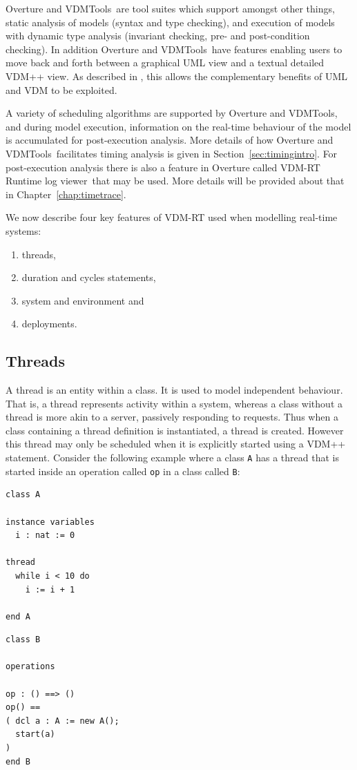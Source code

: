 \documentclass{overturerepchap}
\newcommand{\vdmtools}{VDMTools}
\newcommand{\VDMTools}{VDMTools}
\newcommand{\showtrace}{VDM-RT Runtime log viewer}
\begin{document}
Overture and \VDMTools\ are tool suites which support amongst other
things, static analysis of models (syntax and type checking), and
execution of models with dynamic type analysis (invariant checking,
pre- and post-condition checking). In addition Overture and
\vdmtools\ have features enabling users to move back and forth between
a graphical UML view and a textual detailed VDM++ view. As described
in \cite{Guidelines}, this allows the complementary benefits of UML
and VDM to be exploited.

A variety of scheduling algorithms are supported by Overture and \vdmtools,
and during model execution, information on the real-time behaviour of
the model is accumulated for post-execution analysis. More details of
how Overture and \VDMTools\ facilitates timing analysis is given in
Section~\ref{sec:timingintro}. For post-execution analysis there is also
a feature in Overture
called \showtrace\ that may be used. More details will be
provided about that in Chapter~\ref{chap:timetrace}.

We now describe four key features of VDM-RT used when modelling
real-time systems: 
\begin{enumerate}
\item threads,
\item duration and cycles statements,
\item system and environment and
\item deployments.
\end{enumerate}

\subsection{Threads}

A thread is an entity within a class. It is used to model independent
behaviour. That is, a thread represents activity within a system,
whereas a class without a thread is more akin to a server, passively
responding to requests. Thus when a class containing a thread
definition is instantiated, a thread is created. However this thread
may only be scheduled when it is explicitly started using a VDM++
{\bf{}} statement. Consider the following example where a class
\texttt{A} has a thread that is started inside an operation called 
\texttt{op} in a class called \texttt{B}:

\begin{multicols}{2}
\begin{lstlisting}
class A

instance variables
  i : nat := 0

thread
  while i < 10 do
    i := i + 1

end A
\end{lstlisting}
\begin{lstlisting}
class B

operations

op : () ==> ()
op() ==
( dcl a : A := new A();
  start(a)
)
end B
\end{lstlisting}
\end{multicols}
\end{document}
